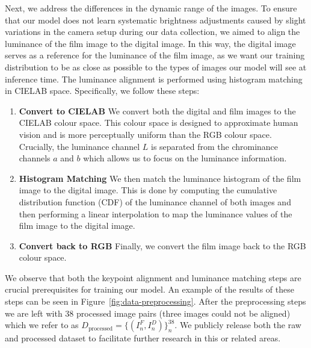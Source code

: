 Next, we address the differences in the dynamic range of the images. To ensure that our model does not learn systematic brightness adjustments caused by slight variations in the camera setup during our data collection, we aimed to align the luminance of the film image to the digital image. In this way, the digital image serves as a reference for the luminance of the film image, as we want our training distribution to be as close as possible to the types of images our model will see at inference time. The luminance alignment is performed using histogram matching in CIELAB space. Specifically, we follow these steps:

\begin{enumerate}
    \item \textbf{Convert to CIELAB} We convert both the digital and film images to the CIELAB colour space. This colour space is designed to approximate human vision and is more perceptually uniform than the RGB colour space. Crucially, the luminance channel $L$ is separated from the chrominance channels $a$ and $b$ which allows us to focus on the luminance information.
    \item \textbf{Histogram Matching} We then match the luminance histogram of the film image to the digital image. This is done by computing the cumulative distribution function (CDF) of the luminance channel of both images and then performing a linear interpolation to map the luminance values of the film image to the digital image.
    \item \textbf{Convert back to RGB} Finally, we convert the film image back to the RGB colour space.
\end{enumerate}

We observe that both the keypoint alignment and luminance matching steps are
crucial prerequisites for training our model. An example of the results of these
steps can be seen in Figure~\ref{fig:data-preprocessing}. After the
preprocessing steps we are left with 38 processed image pairs (three images
could not be aligned) which we refer to as $D_{\text{processed}}=\{(I^F_n,
I^D_n)\}_n^{38}$. We publicly release both the raw and processed dataset to
facilitate further research in this or related areas.

